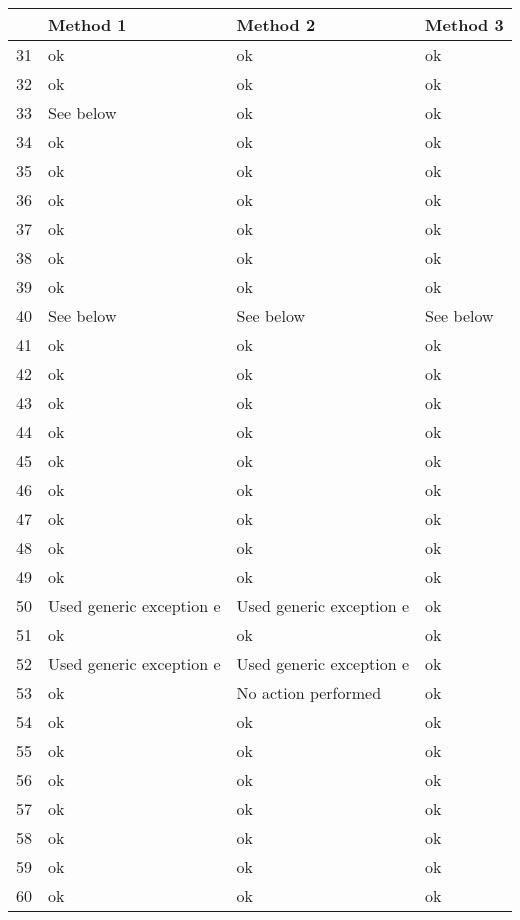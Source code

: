 \begin{tabular}{|c|p{4cm}|p{4cm}|p{4cm}|}
\hline
 & Method 1 & Method 2 & Method 3\\
\hline
31 & ok & ok & ok \\
\hline
32 & ok & ok & ok \\
\hline
33 & See below & ok & ok \\
\hline
34 & ok & ok & ok \\
\hline
35 & ok & ok & ok \\
\hline
36 & ok & ok & ok \\
\hline
37 & ok & ok & ok \\
\hline
38 & ok & ok & ok \\
\hline
39 & ok & ok & ok \\
\hline
40 & See below & See below & See below \\
\hline
41 & ok & ok & ok \\
\hline
42 & ok & ok & ok \\
\hline
43 & ok & ok & ok \\
\hline
44 & ok & ok & ok \\
\hline
45 & ok & ok & ok \\
\hline
46 & ok & ok & ok \\
\hline
47 & ok & ok & ok \\
\hline
48 & ok & ok & ok \\
\hline
49 & ok & ok & ok \\
\hline
50 & Used generic exception e & Used generic exception e & ok \\
\hline
51 & ok & ok & ok \\
\hline
52 & Used generic exception e & Used generic exception e & ok \\
\hline
53 & ok & No action performed & ok \\
\hline	
54 & ok & ok & ok \\
\hline
55 & ok & ok & ok \\
\hline
56 & ok & ok & ok \\
\hline
57 & ok & ok & ok \\
\hline
58 & ok & ok & ok \\
\hline
59 & ok & ok & ok \\
\hline
60 & ok & ok & ok \\
\hline
\end{tabular}










